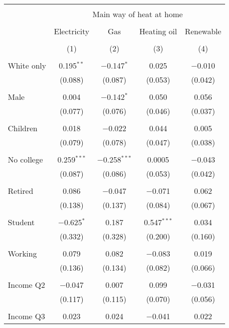 
\begin{tabular}{@{\extracolsep{5pt}}lcccc} 
\\[-1.8ex]\hline 
\hline \\[-1.8ex] 
 & \multicolumn{4}{c}{Main way of heat at home} \\ 
\cline{2-5} 
\\[-1.8ex] & Electricity & Gas & Heating oil & Renewable \\ 
\\[-1.8ex] & (1) & (2) & (3) & (4)\\ 
\hline \\[-1.8ex] 
 White only & 0.195$^{**}$ & $-$0.147$^{*}$ & 0.025 & $-$0.010 \\ 
  & (0.088) & (0.087) & (0.053) & (0.042) \\ 
  & & & & \\ 
 Male & 0.004 & $-$0.142$^{*}$ & 0.050 & 0.056 \\ 
  & (0.077) & (0.076) & (0.046) & (0.037) \\ 
  & & & & \\ 
 Children & 0.018 & $-$0.022 & 0.044 & 0.005 \\ 
  & (0.079) & (0.078) & (0.047) & (0.038) \\ 
  & & & & \\ 
 No college & 0.259$^{***}$ & $-$0.258$^{***}$ & 0.0005 & $-$0.043 \\ 
  & (0.087) & (0.086) & (0.053) & (0.042) \\ 
  & & & & \\ 
 Retired & 0.086 & $-$0.047 & $-$0.071 & 0.062 \\ 
  & (0.138) & (0.137) & (0.084) & (0.067) \\ 
  & & & & \\ 
 Student & $-$0.625$^{*}$ & 0.187 & 0.547$^{***}$ & 0.034 \\ 
  & (0.332) & (0.328) & (0.200) & (0.160) \\ 
  & & & & \\ 
 Working & 0.079 & 0.082 & $-$0.083 & 0.019 \\ 
  & (0.136) & (0.134) & (0.082) & (0.066) \\ 
  & & & & \\ 
 Income Q2 & $-$0.047 & 0.007 & 0.099 & $-$0.031 \\ 
  & (0.117) & (0.115) & (0.070) & (0.056) \\ 
  & & & & \\ 
 Income Q3 & 0.023 & 0.024 & $-$0.041 & 0.022 \\ 

\end{tabular}
